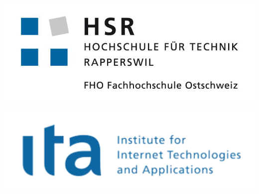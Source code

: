 

\begin{titlepage}
\begin{center}
\begin{minipage}[t]{0.45\textwidth}
    \includegraphics[width=\textwidth]{start/img/hsrLogo}
\end{minipage}
\hspace{\fill} %
\begin{minipage}[t]{0.45\textwidth}
    \vspace{-2.56cm}
    \includegraphics[width=\textwidth]{start/img/itaLogo} %
\end{minipage}

\end{center}

\vspace{15ex} %
\begin{center}
	\Huge 
	\begin{framed}
		\textbf{\titel}
	\end{framed}
	
	\vspace{3ex}
	\textbf{\work}
	
	\vspace{1ex}
	\LARGE 
	\place
	

\end{center}
\end{titlepage}
